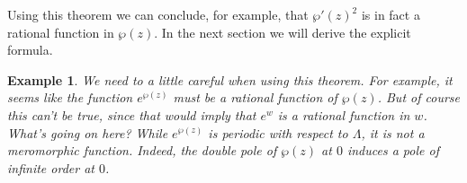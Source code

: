 \documentclass[12pt,reqno]{amsart}
\theoremstyle{plain}
\newtheorem{eg}{Example}
\numberwithin{equation}{section}
\begin{document}
Using this theorem we can conclude, for example, that $\wp'(z)^2$ is in fact a rational function in $\wp(z)$. In the next section we will derive the explicit formula.
\begin{leftbar}
\begin{eg}
    We need to a little careful when using this theorem. For example, it seems like the function $e^{\wp(z)}$ must be a rational function of $\wp(z)$. But of course this can't be true, since that would imply that $e^w$ is a rational function in $w$. What's going on here? While $e^{\wp(z)}$ \textit{is} periodic with respect to $\Lambda$, it is \textit{not} a meromorphic function. Indeed, the double pole of $\wp(z)$ at $0$ induces a pole of \textit{infinite} order at $0$. 
\end{eg}
\end{leftbar}
\end{document}
